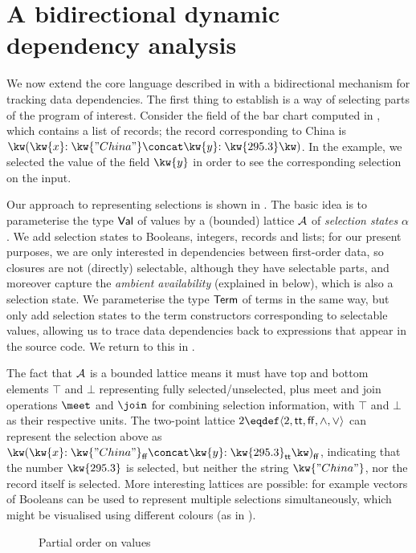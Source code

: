 \section{A bidirectional dynamic dependency analysis}
\label{sec:data-dependencies}

We now extend the core language described in  with a bidirectional mechanism for tracking data dependencies.  The first thing to establish is a way of selecting parts of the program of interest. Consider the  field of the bar chart computed in , which contains a list of records; the record corresponding to China is $\exRec{\bind{\kw{x}}{\kw{"China"}} \concat \bind{\kw{y}}{\kw{295.3}}}$. In the example, we selected the value of the field $\kw{y}$ in order to see the corresponding selection on the input.

Our approach to representing selections is shown in . The basic idea is to parameterise the type $\textup{\textsf{Val}}$ of values by a (bounded) lattice $\mathcal{A}$ of \emph{selection states} $\alpha$. We add selection states to Booleans, integers, records and lists; for our present purposes, we are only interested in dependencies between first-order data, so closures are not (directly) selectable, although they have selectable parts, and moreover capture the \emph{ambient availability} (explained in  below), which is also a selection state. We parameterise the type $\textup{\textsf{Term}}$ of terms in the same way, but only add selection states to the term constructors corresponding to selectable values, allowing us to trace data dependencies back to expressions that appear in the source code. We return to this in .



The fact that $\mathcal{A}$ is a bounded lattice means it must have top and bottom elements $\top$ and $\bot$ representing fully selected/unselected, plus meet and join operations $\meet$ and $\join$ for combining selection information, with $\top$ and $\bot$ as their respective units. The two-point lattice $\Bool \eqdef \Lattice{\Bool}{\TT}{\FF}{\wedge}{\vee}$ can represent the selection above as $\annRec{\bind{\kw{x}}{\annStr{\kw{"China"}}{\FF}} \concat \bind{\kw{y}}{\annInt{\kw{295.3}}{\TT}}}{\FF}$, indicating that the number $\exInt{\kw{295.3}}$ is selected, but neither the string $\exStr{\kw{"China"}}$, nor the record itself is selected. More interesting lattices are possible: for example vectors of Booleans can be used to represent multiple selections simultaneously, which might be visualised using different colours (as in ).

\begin{figure}
   
   \caption{Partial order on values}
   \label{fig:data-dependencies:leq}
\end{figure}



